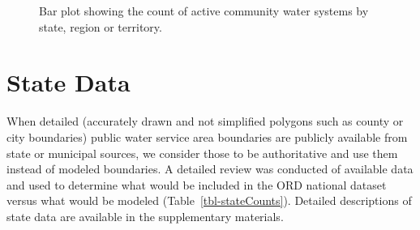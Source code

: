 \documentclass[12pt]{article}
\begin{document}
\begin{figure}


\caption{\label{fig-statePlot}Bar plot showing the count of active
community water systems by state, region or territory.}

\end{figure}%

\section{State Data}\label{state-data}

When detailed (accurately drawn and not simplified polygons such as
county or city boundaries) public water service area boundaries are
publicly available from state or municipal sources, we consider those to
be authoritative and use them instead of modeled boundaries. A detailed
review was conducted of available data and used to determine what would
be included in the ORD national dataset versus what would be modeled
(Table~\ref{tbl-stateCounts}). Detailed descriptions of state data are
available in the supplementary materials.
\end{document}
